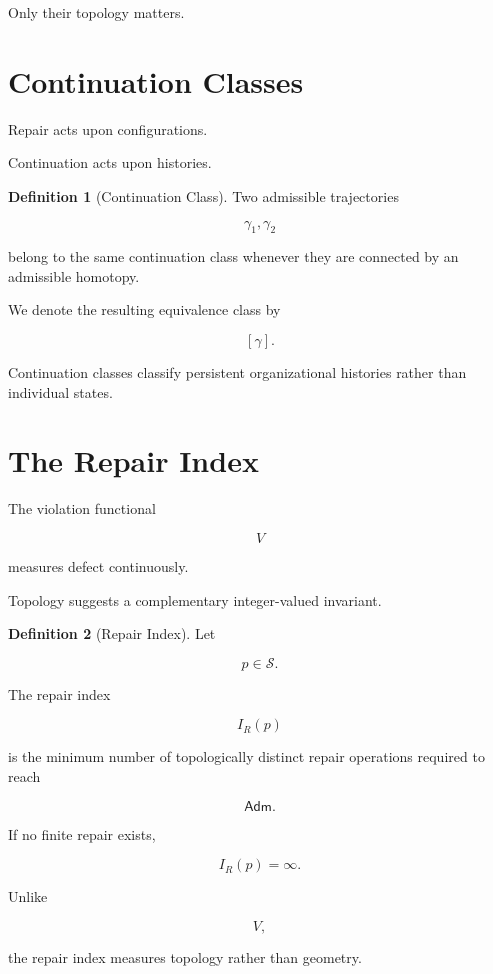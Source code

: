 \documentclass[11pt,oneside]{book}
\numberwithin{equation}{chapter}
\theoremstyle{definition}
\newtheorem{definition}{Definition}[chapter]
\theoremstyle{plain}
\newcommand{\State}{\mathcal{S}}
\newcommand{\Adm}{\mathsf{Adm}}
\begin{document}
Only their topology matters.

\section{Continuation Classes}

Repair acts upon configurations.

Continuation acts upon histories.

\begin{definition}[Continuation Class]

Two admissible trajectories

\[
\gamma_1,
\gamma_2
\]

belong to the same continuation class whenever they are connected by an
admissible homotopy.

We denote the resulting equivalence class by

\[
[\gamma].
\]

\end{definition}

Continuation classes classify persistent organizational histories rather
than individual states.

\section{The Repair Index}

The violation functional

\[
V
\]

measures defect continuously.

Topology suggests a complementary integer-valued invariant.

\begin{definition}[Repair Index]

Let

\[
p
\in
\State.
\]

The repair index

\[
I_R(p)
\]

is the minimum number of topologically distinct repair operations required
to reach

\[
\Adm.
\]

If no finite repair exists,

\[
I_R(p)=\infty.
\]

\end{definition}

Unlike

\[
V,
\]

the repair index measures topology rather than geometry.
\end{document}
